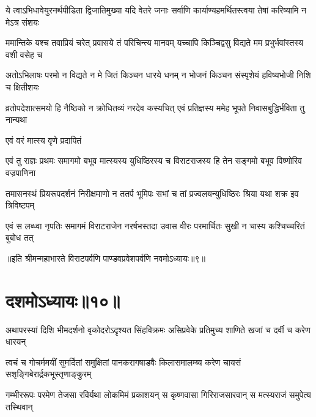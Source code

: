\fourlineindentedshloka
{ये त्वाऽभिधावेयुरनर्थपीडिता}
{द्विजातिमुख्या यदि वेतरे जनाः}
{सर्वाणि कार्याण्यहमर्थितस्त्वया}
{तेषां करिष्यामि न मेऽत्र संशयः}


\fourlineindentedshloka
{ममान्तिके यश्च तवाप्रियं चरेत्}
{प्रवासये तं परिचिन्त्य मानवम्}
{यच्चापि किञ्चिद्वसु विद्यते मम}
{प्रभुर्भवांस्तस्य वशी वसेह च}




\fourlineindentedshloka
{अतोऽभिलाषः परमो न विद्यते}
{न मे जितं किञ्चन धारये धनम्}
{न भोजनं किञ्चन संस्पृशेयं}
{हविष्यभोजी निशि च क्षितीशयः}


\fourlineindentedshloka
{व्रतोपदेशात्समयो हि नैष्ठिको}
{न क्रोधितव्यं नरदेव कस्यचित्}
{एवं प्रतिज्ञस्य ममेह भूपते}
{निवासबुद्धिर्भविता तु नान्यथा}


{एवं वरं मात्स्य वृणे प्रदापितं\hspace{\shlokaspaceskip}}\\



\fourlineindentedshloka
{एवं तु राज्ञः प्रथमः समागमो}
{बभूव मात्स्यस्य युधिष्ठिरस्य च}
{विराटराजस्य हि तेन सङ्गमो}
{बभूव विष्णोरिव वज्रपाणिना}


\fourlineindentedshloka
{तमासनस्थं प्रियरूपदर्शनं}
{निरीक्षमाणो न ततर्प भूमिपः}
{सभां च तां प्रज्वलयन्युधिष्ठिरः}
{श्रिया यथा शक्र इव त्रिविष्टपम्}


\fourlineindentedshloka
{एवं स लब्ध्वा नृपतिः समागमं}
{विराटराजेन नरर्षभस्तदा}
{उवास वीरः परमार्चितः सुखी}
{न चास्य कश्चिच्चरितं बुबोध तत्}

॥इति श्रीमन्महाभारते विराटपर्वणि पाण्डवप्रवेशपर्वणि नवमोऽध्यायः॥९॥

\chapter{दशमोऽध्यायः॥१०॥}

\fourlineindentedshloka
{अथापरस्यां दिशि भीमदर्शनो}
{वृकोदरोऽदृश्यत सिंहविक्रमः}
{असिप्रवेके प्रतिमुच्य शाणिते}
{खजां च दर्वी च करेण धारयन्}


\fourlineindentedshloka
{त्वचं च गोचर्ममयीं सुमर्दितां}
{समुक्षितां पानकरागषाडवैः}
{किलासमालम्ब्य करेण चायसं}
{सशृङ्गिबेरार्द्रकभूस्तृणाङ्कुरम्}


\fourlineindentedshloka
{गम्भीररूपः परमेण तेजसा}
{रविर्यथा लोकमिमं प्रकाशयन्}
{स कृष्णवासा गिरिराजसारवान्}
{स मत्स्यराजं समुपेत्य तस्थिवान्}


